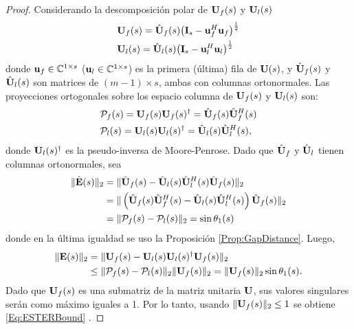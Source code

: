 \begin{proof} Considerando la descomposición polar de $\mathbf{U}_f(s)$ y $\mathbf{U}_l(s)$
	\begin{equation}
		\begin{aligned}
			& \mathbf{U}_f(s) = \hat{\mathbf{U}}_f(s)\big(\mathbf{I}_s -         \mathbf{u}_f^H\mathbf{u}_f\big)^{\frac{1}{2}}\\
			& \mathbf{U}_l(s) = \hat{\mathbf{U}}_l(s)\big(\mathbf{I}_s -         \mathbf{u}_l^H\mathbf{u}_l\big)^{\frac{1}{2}}
		\end{aligned}
		\label{Eq:nearest_Orthonormal}
	\end{equation}
	donde $\mathbf{u}_f\in\mathbb{C}^{1\times s}$ ($\mathbf{u}_l\in\mathbb{C}^{1\times s}$) es la primera (última) fila de $\mathbf{U}(s)$, y $\hat{\mathbf{U}}_f(s)$ y $\hat{\mathbf{U}}_l(s) $ son matrices de $(m-1)\times s$, ambas con columnas ortonormales. Las proyecciones ortogonales sobre los espacio columna de  $\mathbf{U}_f(s)$ y $\mathbf{U}_l(s)$ son:  
	\begin{equation}
		\begin{aligned}
			& \mathcal{P}_f(s) = \mathbf{U}_f(s)\mathbf{U}_f(s)^\dagger = \hat{\mathbf{U}}_{f}(s)\hat{\mathbf{U}}_{f}^H(s) \\
			& \mathcal{P}_l(s) = \mathbf{U}_l(s)\mathbf{U}_l(s)^\dagger = \hat{\mathbf{U}}_{l}(s)\hat{\mathbf{U}}_{l}^H(s),
		\end{aligned}
		\label{Eq:ProjMatrix}
	\end{equation}
	donde $\mathbf{U}_l(s)^\dagger$ es la pseudo-inversa de Moore-Penrose. 
	Dado que $\hat{\mathbf{U}}_f$ y $\hat{\mathbf{U}}_l$ tienen columnas ortonormales, sea
	\[\begin{aligned} \|\hat{\mathbf{E}}(s)\|_2 & = \|\hat{\mathbf{U}}_{f}(s) -\hat{\mathbf{U}}_{l}(s)\hat{\mathbf{U}}_l^H(s)\hat{\mathbf{U}}_f(s)\|_2 \\\ & = \|\left(\hat{\mathbf{U}}_{f}(s)\hat{\mathbf{U}}_{f}^H(s) -\hat{\mathbf{U}}_{l}(s)\hat{\mathbf{U}}_l^H(s)\right)\hat{\mathbf{U}}_f(s)\|_2\\
		&  = \|\mathcal{P}_f(s) - \mathcal{P}_l(s)\|_2 = \sin \theta_1(s)
	\end{aligned}
	\]
	donde en la última igualdad se uso la Proposición \ref{Prop:GapDistance}. Luego,
	\begin{equation}
		\begin{aligned} \|\mathbf{E}(s)\|_2 & = \|\mathbf{U}_{f}(s) -\mathbf{U}_{l}(s)\mathbf{U}_l(s)^\dagger\mathbf{U}_f(s)\|_2 \\
			&\le \|\mathcal{P}_f(s) - \mathcal{P}_l(s)\|_2\|\mathbf{U}_f(s)\|_2 = \|\mathbf{U}_f(s)\|_2\sin \theta_1(s). \end{aligned}
		\label{Eq:ESTER_gap_Theo}
	\end{equation}
	Dado que $\mathbf{U}_f(s)$ es una submatriz de la matriz unitaria $\mathbf{U}$, sus valores singulares serán como máximo iguales a 1. Por lo tanto,  usando $\|\mathbf{U}_f(s)\|_2\leq 1$ se obtiene \eqref{Eq:ESTERBound} . \end{proof}


